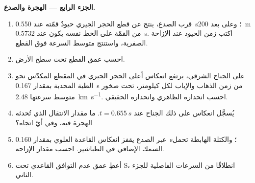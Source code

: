 \begin{problem}
\noindent\textbf{الجزء الرابع --- الهجرة والصدع.}
\begin{enumerate}[resume]
  \item قرب الصدع، ينتج عن قطع الحجر الجيري حيودٌ
        قمّته عند \qty{0.550}{s}؛ وعلى بعد \qty{200}{m} من القمّة على الخط
        نفسه يكون عند \qty{0.5732}{s}. اكتب زمن الحيود عند الإزاحة الصفرية،
        واستنتج متوسط السرعة فوق القطع.
  \item احسب عمق القطع تحت سطح الأرض.
  \item على الجناح الشرقي، يرتفع انعكاس أعلى الحجر الجيري في المقطع المكدّس
        نحو الطية المحدبة بمقدار \qty{0.167}{s} من زمن الذهاب والإياب لكل
        كيلومتر، تحت صخور متوسط سرعتها \qty{2.48}{km.s^{-1}}. احسب انحداره
        الظاهري وانحداره الحقيقي.
  \item يُسجَّل انعكاس على ذلك الجناح عند $t = \qty{0.655}{s}$. ما مقدار
        الانتقال الذي تُحدثه الهجرة فيه، وفي أيّ اتجاه؟
  \item عبر الصدع يقفز انعكاس القاعدة العلوي بمقدار \qty{0.160}{s}؛
        والكتلة الهابطة تحمل السمك الإضافي في الطباشير. احسب
        مقدار الإزاحة.
  \item أعطِ عمق عدم التوافق القاعدي تحت  S، انطلاقًا من
        السرعات الفاصلية للجزء الثاني.
\end{enumerate}
\end{problem}
